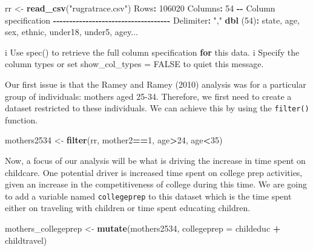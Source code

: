 \documentclass[
]{book}
\newenvironment{Shaded}{\begin{snugshade}}{\end{snugshade}}
\newcommand{\AttributeTok}[1]{\textcolor[rgb]{0.13,0.29,0.53}{#1}}
\newcommand{\ControlFlowTok}[1]{\textcolor[rgb]{0.13,0.29,0.53}{\textbf{#1}}}
\newcommand{\DecValTok}[1]{\textcolor[rgb]{0.00,0.00,0.81}{#1}}
\newcommand{\FunctionTok}[1]{\textcolor[rgb]{0.13,0.29,0.53}{\textbf{#1}}}
\newcommand{\NormalTok}[1]{#1}
\newcommand{\OtherTok}[1]{\textcolor[rgb]{0.56,0.35,0.01}{#1}}
\newcommand{\SpecialCharTok}[1]{\textcolor[rgb]{0.81,0.36,0.00}{\textbf{#1}}}
\newcommand{\StringTok}[1]{\textcolor[rgb]{0.31,0.60,0.02}{#1}}
\begin{document}
\begin{Shaded}
\begin{Highlighting}[]
\NormalTok{rr }\OtherTok{\textless{}{-}} \FunctionTok{read\_csv}\NormalTok{(}\StringTok{"rugratrace.csv"}\NormalTok{)}
\NormalTok{Rows}\SpecialCharTok{:} \DecValTok{106020}\NormalTok{ Columns}\SpecialCharTok{:} \DecValTok{54}
\SpecialCharTok{{-}{-}}\NormalTok{ Column specification }\SpecialCharTok{{-}{-}{-}{-}{-}{-}{-}{-}{-}{-}{-}{-}{-}{-}{-}{-}{-}{-}{-}{-}{-}{-}{-}{-}{-}{-}{-}{-}{-}{-}{-}{-}{-}{-}{-}{-}}
\NormalTok{Delimiter}\SpecialCharTok{:} \StringTok{","}
\FunctionTok{dbl}\NormalTok{ (}\DecValTok{54}\NormalTok{)}\SpecialCharTok{:}\NormalTok{ state, age, sex, ethnic, under18, under5, agey...}

\NormalTok{i Use }\StringTok{\textasciigrave{}}\AttributeTok{spec()}\StringTok{\textasciigrave{}}\NormalTok{ to retrieve the full column specification }\ControlFlowTok{for}\NormalTok{ this data.}
\NormalTok{i Specify the column types or set }\StringTok{\textasciigrave{}}\AttributeTok{show\_col\_types = FALSE}\StringTok{\textasciigrave{}}\NormalTok{ to quiet this message.}
\end{Highlighting}
\end{Shaded}

Our first issue is that the Ramey and Ramey (2010) analysis was for a particular group of individuals: mothers aged 25-34. Therefore, we first need to create a dataset restricted to these individuals. We can achieve this by using the \texttt{filter()} function.

\begin{Shaded}
\begin{Highlighting}[]
\NormalTok{mothers2534 }\OtherTok{\textless{}{-}} \FunctionTok{filter}\NormalTok{(rr, mother2}\SpecialCharTok{==}\DecValTok{1}\NormalTok{, age}\SpecialCharTok{\textgreater{}}\DecValTok{24}\NormalTok{, age}\SpecialCharTok{\textless{}}\DecValTok{35}\NormalTok{)}
\end{Highlighting}
\end{Shaded}

Now, a focus of our analysis will be what is driving the increase in time spent on childcare. One potential driver is increased time spent on college prep activities, given an increase in the competitiveness of college during this time. We are going to add a variable named \texttt{collegeprep} to this dataset which is the time spent either on traveling with children or time spent educating children.

\begin{Shaded}
\begin{Highlighting}[]
\NormalTok{mothers\_collegeprep }\OtherTok{\textless{}{-}} \FunctionTok{mutate}\NormalTok{(mothers2534, }
                              \AttributeTok{collegeprep =}\NormalTok{ childeduc }\SpecialCharTok{+}\NormalTok{ childtravel)}
\end{Highlighting}
\end{Shaded}
\end{document}
